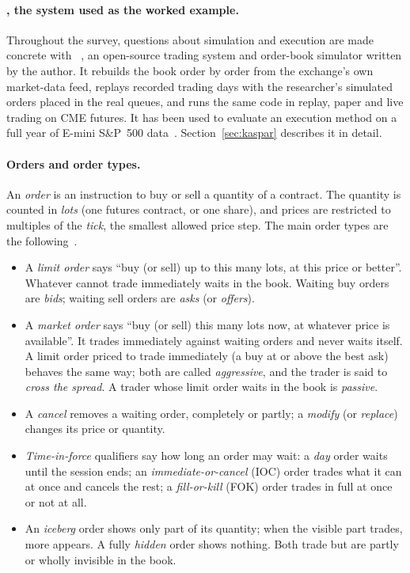 \paragraph{\kasparhft{}, the system used as the worked example.} Throughout the survey, questions about simulation and
execution are made concrete with \kasparhft{}~\citep{kaspar_hft}, an open-source trading system and order-book simulator
written by the author. It rebuilds the book order by order from the exchange's own market-data feed, replays recorded
trading days with the researcher's simulated orders placed in the real queues, and runs the same code in replay, paper
and live trading on CME futures. It has been used to evaluate an execution method on a full year of E-mini S\&P~500
data~\citep{maciejewski_shadow}. Section~\ref{sec:kaspar} describes it in detail.

\paragraph{Orders and order types.}
An \emph{order} is an instruction to buy or sell a quantity of a contract. The quantity is counted
in \emph{lots} (one futures contract, or one share), and prices are restricted to multiples of the
\emph{tick}, the smallest allowed price step. The main order types are the
following~\citep{harris2003}.
\begin{itemize}[leftmargin=1.5em,itemsep=1pt]
\item A \emph{limit order} says ``buy (or sell) up to this many lots, at this price or better''.
  Whatever cannot trade immediately waits in the book. Waiting buy orders are \emph{bids}; waiting
  sell orders are \emph{asks} (or \emph{offers}).
\item A \emph{market order} says ``buy (or sell) this many lots now, at whatever price is
  available''. It trades immediately against waiting orders and never waits itself. A limit order
  priced to trade immediately (a buy at or above the best ask) behaves the same way; both are called
  \emph{aggressive}, and the trader is said to \emph{cross the spread}. A trader whose limit order
  waits in the book is \emph{passive}.
\item A \emph{cancel} removes a waiting order, completely or partly; a \emph{modify} (or
  \emph{replace}) changes its price or quantity.
\item \emph{Time-in-force} qualifiers say how long an order may wait: a \emph{day} order waits
  until the session ends; an \emph{immediate-or-cancel} (IOC) order trades what it can at once and
  cancels the rest; a \emph{fill-or-kill} (FOK) order trades in full at once or not at all.
\item An \emph{iceberg} order shows only part of its quantity; when the visible part trades,
  more appears. A fully \emph{hidden} order shows nothing. Both trade but are partly or wholly
  invisible in the book.
\end{itemize}

